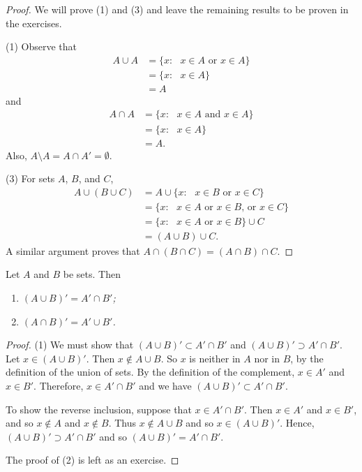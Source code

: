 \begin{proof}
We will prove (1) and (3) and leave the remaining results to be proven in the exercises. 

(1)
Observe that
\begin{align*}
A \cup A & =  \{ x : \mbox{ $x \in A$ or $x \in A$} \} \\
& =  \{ x : \mbox{ $x \in A$} \} \\
& =  A
\end{align*}
and
\begin{align*}
A \cap A & =  \{ x : \mbox{ $x \in A$ and $x \in A$} \} \\
& =  \{ x : \mbox{ $x \in A$}  \} \\
& =  A.
\end{align*}
Also, $A \setminus A = A \cap A' = \emptyset$.
 
(3)
For sets $A$, $B$, and $C$,
\begin{align*}
A \cup (B \cup C)
& =
A \cup \{ x : \mbox{ $x \in B$ or $x \in C$} \} \\
& =
\{ x : \mbox{ $x \in A$ or $x \in B$, or $x \in C$} \} \\
& =
\{ x : \mbox{ $x \in A$ or $x \in B$} \} \cup C \\
& =
(A \cup B) \cup C.
\end{align*}
A  similar argument proves that  $A \cap (B \cap C) = (A \cap B) \cap
C$. 
\end{proof}

\begin{theorem}\label{sets_de_morgan}
Let $A$ and $B$ be sets. Then 
\begin{enumerate}
 
\rm\item\it
$(A \cup B)' = A' \cap B'$; 
 
\rm\item\it
$(A \cap B)' = A' \cup B'$.
 
\end{enumerate}
\end{theorem}
 
\begin{proof}
(1) 
We must show that $(A \cup B)' \subset A' \cap B'$ and $(A \cup B)' \supset A' \cap B'$. Let $x \in (A \cup B)'$.  Then $x \notin A \cup B$. So $x$ is neither in $A$ nor in $B$, by the definition of the union of sets.  By the definition of the complement, $x \in A'$ and $x \in B'$.  Therefore, $x \in A' \cap B'$ and we have $(A \cup B)' \subset A' \cap B'$.
 
To show the reverse inclusion, suppose that $x \in A' \cap B'$.  Then $x \in A'$ and $x \in B'$, and so $x \notin A$ and $x \notin B$.  Thus $x \notin A \cup B$ and so $x \in (A \cup B)'$.  Hence, $(A \cup B)' \supset A' \cap B'$ and so $(A \cup B)' = A' \cap B'$. 

The proof of (2) is left as an exercise.
\end{proof}
 
